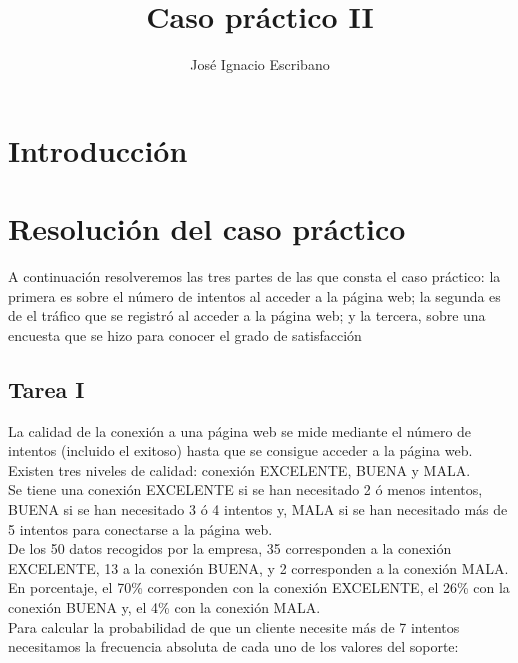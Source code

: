 \documentclass[12pt,a4paper,twoside,openright,titlepage,final]{article}
\author{José Ignacio Escribano}
\title{Caso práctico II}
\begin{document}
\setcounter{page}{1}


\listoffigures
\thispagestyle{empty}
\newpage

\tableofcontents
\thispagestyle{empty}
\newpage


\setcounter{page}{1}

\section{Introducción}

\section{Resolución del caso práctico}

A continuación resolveremos las tres partes de las que consta el caso práctico: la primera es sobre el número de intentos al acceder a la página web; la segunda es de el tráfico que se registró al acceder a la página web; y la tercera, sobre una encuesta que se hizo para conocer el grado de satisfacción 

\subsection{Tarea I}

La calidad de la conexión a una página web se mide mediante el número de intentos (incluido el exitoso) hasta que se consigue acceder a la página web. Existen tres niveles de calidad: conexión EXCELENTE, BUENA y MALA.\\
Se tiene una conexión EXCELENTE si se han necesitado 2 ó menos intentos, BUENA si se han necesitado 3 ó 4 intentos y, MALA si se han necesitado más de 5 intentos para conectarse a la página web.\\

De los 50 datos recogidos por la empresa, 35 corresponden a la conexión EXCELENTE, 13 a la conexión BUENA, y 2 corresponden a la conexión MALA. En porcentaje, el 70\% corresponden con la conexión EXCELENTE, el 26\% con la conexión BUENA y, el 4\% con la conexión MALA.\\

Para calcular la probabilidad de que un cliente necesite más de 7 intentos necesitamos la frecuencia absoluta de cada uno de los valores del soporte:
\end{document}
